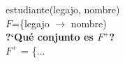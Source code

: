 \documentclass[preview]{standalone}
\begin{document}
estudiante(legajo, nombre)\\
$F$=\{legajo $\rightarrow$ nombre)\\

\textbf{?`Qu\'e conjunto es $F^+$?}\\

$F^+$ = \big\{$\dots$
\end{document}
